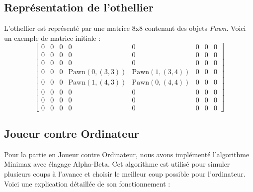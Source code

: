 \documentclass[a4paper,12pt]{article}
\begin{document}
\subsection{Représentation de l'othellier}
L'othellier est représenté par une matrice 8x8 contenant des objets \emph{Pawn}. Voici un exemple de matrice initiale :
\[
\begin{bmatrix}
    0 & 0 & 0 & 0 & 0 & 0 & 0 & 0\\
    0 & 0 & 0 & 0 & 0 & 0 & 0 & 0\\
    0 & 0 & 0 & 0 & 0 & 0 & 0 & 0\\
    0 & 0 & 0 & \text{Pawn}(0, (3,3)) & \text{Pawn}(1, (3,4)) & 0 & 0 & 0\\
    0 & 0 & 0 & \text{Pawn}(1, (4,3)) & \text{Pawn}(0, (4,4)) & 0 & 0 & 0\\
    0 & 0 & 0 & 0 & 0 & 0 & 0 & 0\\
    0 & 0 & 0 & 0 & 0 & 0 & 0 & 0\\
    0 & 0 & 0 & 0 & 0 & 0 & 0 & 0
\end{bmatrix}
\]

\subsection{Joueur contre Ordinateur}
Pour la partie en Joueur contre Ordinateur, nous avons implémenté l'algorithme Minimax avec élagage Alpha-Beta. Cet algorithme est utilisé pour simuler plusieurs coups à l'avance et choisir le meilleur coup possible pour l'ordinateur. Voici une explication détaillée de son fonctionnement :
\end{document}

